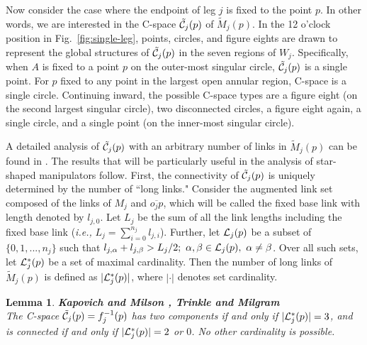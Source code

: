\documentclass[twocolumn]{IEEEtran}
\newtheorem{Lemma}{{\bf Lemma}}
\begin{document}
Now consider the case where the endpoint of leg $j$ is fixed to the
point $p$.  In other words, we are interested in the C-space $\tilde
{\cal C}_j(p)$ of $\tilde M_j(p)$. In the 12 o'clock position in
Fig.~\ref{fig:single-leg}, points, circles, and figure eights are
drawn to represent the global structures of $\tilde {\cal C}_j(p)$
in the seven regions of $W_j$. Specifically, when $A$ is fixed to a
point $p$ on the outer-most singular circle, $\tilde {\cal C}_j(p)$
is a single point. For $p$ fixed to any point in the largest open
annular region, C-space is a single circle. Continuing inward, the
possible C-space types are a figure eight (on the second largest
singular circle), two disconnected circles, a figure eight again, a
single circle, and a single point (on the inner-most singular
circle).

A detailed analysis of $\tilde {\cal C}_j(p)$ with an arbitrary
number of links in $\tilde M_j(p)$ can be found in \cite{TM02}. The
results that will be particularly useful in the analysis of
star-shaped manipulators follow.  First, the connectivity of $\tilde
{\cal C}_j(p)$ is uniquely determined by the number of ``long
links."  Consider the augmented link set composed of the links of
$M_j$ and $\overline {o_jp}$, which will be called the fixed base
link with length denoted by $l_{j,0}$. Let $L_j$ be the sum of all
the link lengths including the fixed base link ({\em i.e.,} $L_j =
\sum_{i=0}^{n_j} l_{j,i}$). Further, let ${\cal L}_j(p)$ be a subset
of $\{0,1,...,n_j\}$ such that $l_{j,\alpha}+l_{j,\beta} > L_j / 2;
\ \alpha,\beta \in {\cal L}_j(p), \ \alpha \neq \beta$. Over all
such sets, let ${\cal L}_j^*(p)$ be a set of maximal cardinality.
Then the number of long links of $\tilde M_j(p)$ is defined as
$|{\cal L}_j^*(p)|$, where $| \cdot |$ denotes set cardinality.

\medskip
\begin{Lemma} {\bf Kapovich and Milson \cite{KM95}, Trinkle and
Milgram \cite{TM02}}\\
\label{lem-02} \rm The C-space $\tilde {\cal C}_j(p) = f_j^{-1}(p)$
has two components if and only if $|{\cal L}_j^*(p)|=3$, and is
connected if and only if $|{\cal L}_j^*(p)|=2$ or $0$. No other
cardinality is possible.
\end{Lemma}

\medskip
\end{document}
